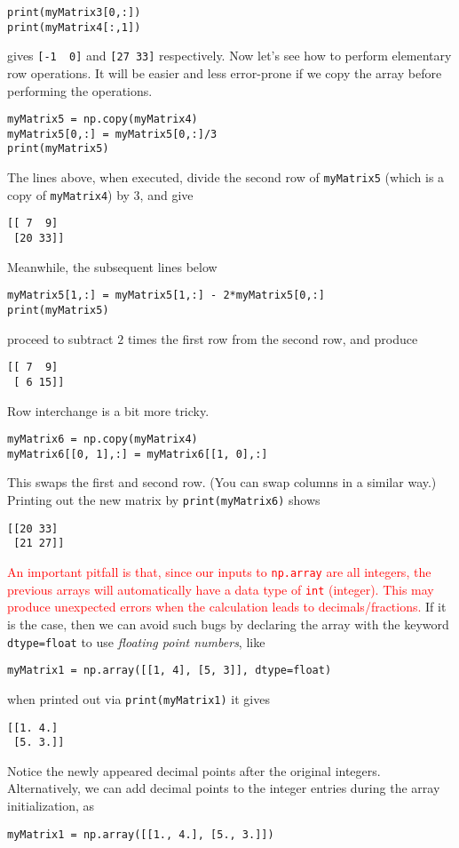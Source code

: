 \begin{lstlisting}
print(myMatrix3[0,:])
print(myMatrix4[:,1])
\end{lstlisting}
gives
\verb|[-1  0]| and \verb|[27 33]| respectively. Now let's see how to perform elementary row operations. It will be easier and less error-prone if we copy the array before performing the operations.
\begin{lstlisting}
myMatrix5 = np.copy(myMatrix4)
myMatrix5[0,:] = myMatrix5[0,:]/3
print(myMatrix5)
\end{lstlisting}
The lines above, when executed, divide the second row of \verb|myMatrix5| (which is a copy of \verb|myMatrix4|) by $3$, and give
\begin{lstlisting}
[[ 7  9]
 [20 33]]    
\end{lstlisting}
Meanwhile, the subsequent lines below
\begin{lstlisting}
myMatrix5[1,:] = myMatrix5[1,:] - 2*myMatrix5[0,:]
print(myMatrix5)
\end{lstlisting}
proceed to subtract $2$ times the first row from the second row, and produce
\begin{lstlisting}
[[ 7  9]
 [ 6 15]]
\end{lstlisting}
Row interchange is a bit more tricky.
\begin{lstlisting}
myMatrix6 = np.copy(myMatrix4)
myMatrix6[[0, 1],:] = myMatrix6[[1, 0],:]    
\end{lstlisting}
This swaps the first and second row. (You can swap columns in a similar way.) Printing out the new matrix by \verb|print(myMatrix6)| shows
\begin{lstlisting}
[[20 33]
 [21 27]]
\end{lstlisting}
\textcolor{red}{An important pitfall is that, since our inputs to \texttt{np.array} are all integers, the previous arrays will automatically have a data type of \texttt{int} (integer). This may produce unexpected errors when the calculation leads to decimals/fractions.} If it is the case, then we can avoid such bugs by declaring the array with the keyword \verb|dtype=float| to use \textit{floating point numbers}, like
\begin{lstlisting}
myMatrix1 = np.array([[1, 4], [5, 3]], dtype=float) 
\end{lstlisting}
when printed out via \verb|print(myMatrix1)| it gives
\begin{lstlisting}
[[1. 4.]
 [5. 3.]]    
\end{lstlisting}
Notice the newly appeared decimal points after the original integers. Alternatively, we can add decimal points to the integer entries during the array initialization, as
\begin{lstlisting}
myMatrix1 = np.array([[1., 4.], [5., 3.]]) 
\end{lstlisting}

